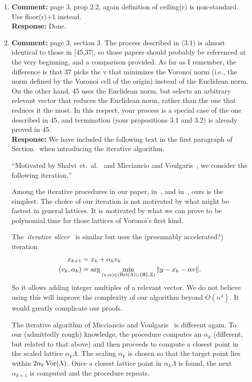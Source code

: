 \documentclass[a4paper,10pt]{article}
\begin{document}
\begin{enumerate}
\item\textbf{Comment:}  
page 3, prop 2.2, again definition of ceiling(r) is non-standard. Use floor(r)+1 instead. 
\\\textbf{Response:}
Done. 

\item\textbf{Comment:}  
page 3, section 3. 
The process described in (3.1) is almost identical to those in [45,37], so those papers should probably be referenced at the very beginning, and a comparison provided. As far as I remember, the difference is that 37 picks the v that minimizes the Voronoi norm (i.e., the norm defined by the Voronoi cell of the origin) instead of the Euclidean norm. On the other hand, 45 uses the Euclidean norm, but selects an arbitrary relevant vector that reduces the Euclidean norm, rather than the one that reduces it the most. In this respect, your process is a special case of the one described in 45, and termination (your propositions 3.1 and 3.2) is already proved in 45. 
\\\textbf{Response:}
We have included the following text in the first paragraph of Section~ when introducing the iterative algorithm.

``Motivated by Shalvi~et.~al.~\cite{Shalvi_iterativeslicer_2009} and  Micciancio and Voulgaris~\cite{MicciancioVoulgaris_deterministic_jv_2013}, we consider the following iteration,''

Among the iterative procedures in our paper, in~\cite{Shalvi_iterativeslicer_2009}, and in~\cite{MicciancioVoulgaris_deterministic_jv_2013}, ours is the simplest.  The choice of our iteration is not motivated by what might be fastest in general lattices.  It is motivated by what we can prove to be polynomial time for those lattices of Voronoi's first kind.

The~\emph{iterative slicer}~\cite{Shalvi_iterativeslicer_2009} is similar but uses the (presumably accelerated?) iteration
\begin{align*}
x_{k+1} &= x_k + \alpha_k v_k  \\
(v_k, \alpha_k) &= \arg\min_{ (v, \alpha) \in ( \operatorname{Rel}(\Lambda) \cup \{\boldsymbol{0}\}, {\mathbb Z}) } \|y - x_k - \alpha v \|.
\end{align*} 
So it allows adding integer multiples of a relevant vector.  We do not believe using this will improve the complexity of our algorithm beyond $O(n^4)$.  It would greatly complicate our proofs.

The iterative algorithm of Micciancio and Voulgaris~\cite{MicciancioVoulgaris_deterministic_jv_2013} is different again.  To our (admittedly rough) knowledge, the procedure computes an $\alpha_k$ (different, but related to that above) and then proceeds to compute a closest point in the scaled lattice $\alpha_k \Lambda$.  The scaling $\alpha_k$ is chosen so that the target point lies within $2\alpha_k \operatorname{Vor}(\Lambda)$.  Once a closest lattice point in $\alpha_k\Lambda$ is found, the next $\alpha_{k+1}$ is computed and the procedure repeats.


\end{enumerate}
\end{document}
